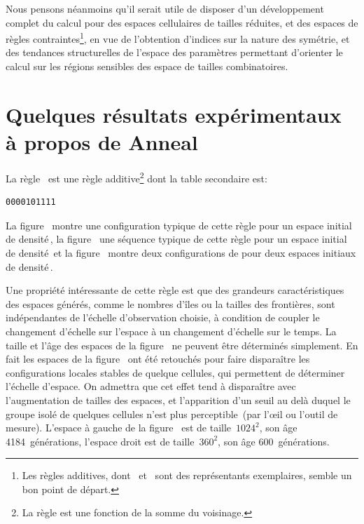 Nous pensons néanmoins qu'il serait utile de disposer d'un
développement complet du calcul pour des espaces cellulaires de
tailles réduites, et des espaces de règles contraintes\footnote{%
  Les règles additives, dont~ et~ sont des
  représentants exemplaires, semble un bon point de départ.}, %
en vue de l'obtention d'indices sur la nature des symétrie, et des
tendances structurelles de l'espace des paramètres permettant d'orienter
le calcul sur les régions sensibles des espace de tailles
combinatoires. %

\section[résultat expérimentaux]%
{Quelques résultats expérimentaux à propos de Anneal}

La règle~ est une règle additive\footnote{%
  La règle est une fonction de la somme du voisinage. %
  } %
dont la table secondaire est:
\begin{verbatim}
0000101111
\end{verbatim}
La figure~ montre une configuration typique
de cette règle pour un espace initial de densité\,\undemi, %
la figure~ une séquence typique de
cette règle pour un espace initial de densité\,\undemi %
et la figure~ montre deux configurations de
 pour deux espaces initiaux de densité\,\undemi. %

Une propriété intéressante de cette règle est que des grandeurs
caractéristiques des espaces générés, comme le nombres d'îles ou la
tailles des frontières, sont indépendantes de l'échelle d'observation
choisie, à condition de coupler le changement d'échelle sur l'espace
à un changement d'échelle sur le temps. %
La taille et l'âge des espaces de la figure~
ne peuvent être déterminés simplement. %
En fait les espaces de la figure~ ont été
retouchés pour faire disparaître les configurations locales stables de
quelque cellules, qui permettent de déterminer l'échelle d'espace. %
On admettra que cet effet tend à disparaître avec l'augmentation de
tailles des espaces, et l'apparition d'un seuil au delà duquel le
groupe isolé de quelques cellules n'est plus perceptible~(par l'œil
ou l'outil de mesure). %
L'espace à gauche de la figure~ est de
taille~$1024^2$, son âge 4184~générations, %
l'espace droit est de taille~$360^2$, son âge 600~générations.

